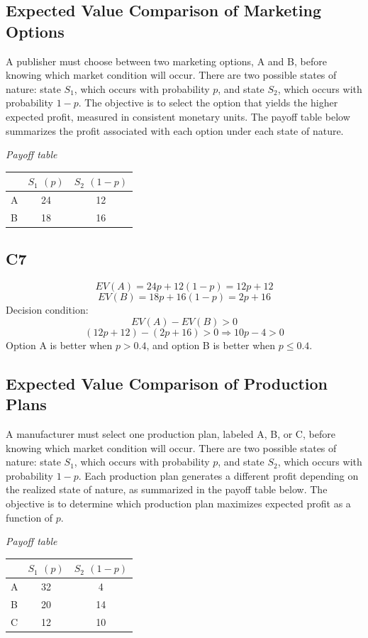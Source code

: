 \begin{ExamProblems}
		\subsection*{Expected Value Comparison of Marketing Options}
		A publisher must choose between two marketing options, A and B, before knowing which market condition will occur.
		There are two possible states of nature: state $S_1$, which occurs with probability $p$, and state $S_2$, which occurs with probability $1-p$.
		The objective is to select the option that yields the higher expected profit, measured in consistent monetary units.
		The payoff table below summarizes the profit associated with each option under each state of nature.
		\begin{center}
			\textit{Payoff table} \\
			\begin{tabular}{l c c}
				\toprule
				& $S_1$ $(p)$ & $S_2$ $(1-p)$ \\
				\midrule
				A & 24 & 12 \\
				B & 18 & 16 \\
				\bottomrule
			\end{tabular}
		\end{center}
		
		\subsection*{C7}
		\[
		EV(A)=24p+12(1-p)=12p+12
		\]
		\[
		EV(B)=18p+16(1-p)=2p+16
		\]
		Decision condition:
		\[
		EV(A)-EV(B)>0
		\]
		\[
		(12p+12)-(2p+16)>0 \Rightarrow 10p-4>0
		\]
		Option A is better when $p>0.4$, and option B is better when $p \le 0.4$.
		
		\item
		\subsection*{Expected Value Comparison of Production Plans}
		A manufacturer must select one production plan, labeled A, B, or C, before knowing which market condition will occur.
		There are two possible states of nature: state $S_1$, which occurs with probability $p$, and state $S_2$, which occurs with probability $1-p$.
		Each production plan generates a different profit depending on the realized state of nature, as summarized in the payoff table below.
		The objective is to determine which production plan maximizes expected profit as a function of $p$.
		
		\begin{center}
			\textit{Payoff table} \\
			\begin{tabular}{l c c}
				\toprule
				& $S_1$ $(p)$ & $S_2$ $(1-p)$ \\
				\midrule
				A & 32 & 4 \\
				B & 20 & 14 \\
				C & 12 & 10 \\
				\bottomrule
			\end{tabular}
		\end{center}
		

\end{ExamProblems}
